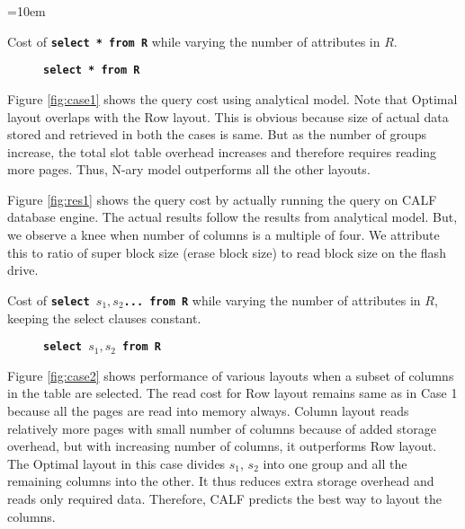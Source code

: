 \documentclass[twocolumn,11pt]{article}
\newcommand{\sql}[1]{{\tt \textbf{#1}}}
\begin{document}
\begin{list}{}{\leftmargin=1em}{\rightmargin=10em}
	\item Cost of \sql{select * from R} while varying the number of attributes in $R$.
	
	\begin{figure*}[ht]
		\caption{\sql{select * from R}}
	\end{figure*}

	Figure \ref{fig:case1} shows the query cost using analytical model. Note that Optimal layout overlaps with 
	the Row layout. This is obvious because size of actual data stored and retrieved in both the 
	cases is same. But as the number of groups increase, the total slot table overhead increases 
	and therefore requires reading more pages. Thus, N-ary model outperforms all the other layouts.

	Figure \ref{fig:res1} shows the query cost by actually running the query on CALF database engine. The actual 
	results follow the results from analytical model. But, we observe a knee when number of columns 
	is a multiple of four. We attribute this to ratio of super block size (erase block size) to read 
	block size on the flash drive. 

	\item Cost of \sql{select $s_1,s_2$... from R} while varying the
	number of attributes in $R$, keeping the select clauses constant.

	\begin{figure*}[ht]
		\caption{\sql{select $s_1,s_2$ from R}}
	\end{figure*}

	Figure \ref{fig:case2} shows performance of various layouts when a subset of columns in the table are selected.
	The read cost for Row layout remains same as in Case 1 because all the pages are read into memory always.
	Column layout reads relatively more pages with small number of columns because of added storage overhead,
	but with increasing number of columns, it outperforms Row layout. The Optimal layout in this case divides
	$s_1$, $s_2$ into one group and all the remaining columns into the other. It thus reduces extra storage 
	overhead and reads only required data. Therefore, CALF predicts the best way to layout the columns.


\end{list}
\end{document}
